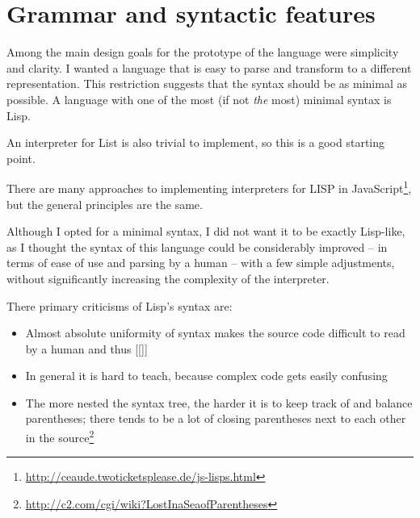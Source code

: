 \section{Grammar and syntactic features}
Among the main design goals for the prototype of the language were simplicity and clarity. I wanted a language that is easy to parse and transform to a different representation. This restriction suggests that the syntax should be as minimal as possible. A language with one of the most (if not \textit{the} most) minimal syntax is Lisp\cite{syntaxation}.

An interpreter for List is also trivial to implement, so this is a good starting point.

There are many approaches to implementing interpreters for LISP in JavaScript\footnote{\url{http://ceaude.twoticketsplease.de/js-lisps.html}}, but the general principles are the same.

Although I opted for a minimal syntax, I did not want it to be exactly Lisp-like, as I thought the syntax of this language could be considerably improved -- in terms of ease of use and parsing by a human -- with a few simple adjustments, without significantly increasing the complexity of the interpreter.

There primary criticisms of Lisp's syntax are:
\begin{itemize}
    \item Almost absolute uniformity of syntax makes the source code difficult to read by a human and thus [[]]
    \item In general it is hard to teach\cite{wadler_critique}, because complex code gets easily confusing
    \item The more nested the syntax tree, the harder it is to keep track of and balance parentheses; there tends to be a lot of closing parentheses next to each other in the source\footnote{\url{http://c2.com/cgi/wiki?LostInaSeaofParentheses}}
\end{itemize}

